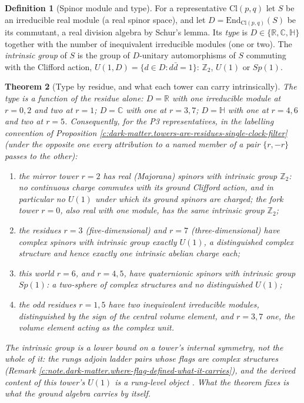 \documentclass[11pt]{article}
\newtheorem{theorem}{Theorem}[section]
\theoremstyle{definition}
\newtheorem{definition}[theorem]{Definition}
\theoremstyle{plain}
\newcommand{\changedmark}[2]{\marginpar{\raggedright\scriptsize\color{#1}#2}}
\providecommand{\C}{}\renewcommand{\C}{\mathbb{C}}
\providecommand{\Cl}{}\renewcommand{\Cl}{\mathrm{Cl}}
\providecommand{\End}{}\renewcommand{\End}{\mathrm{End}}
\providecommand{\R}{}\renewcommand{\R}{\mathbb{R}}
\begin{document}
\begin{definition}[Spinor module and type]\label{c:obj.dark-matter.spinor-module-type}
For a representative $\Cl(p,q)$ let $S$ be an irreducible real module (a real spinor space), and let $D = \End_{\Cl(p,q)}(S)$ be its commutant, a real division algebra by Schur's lemma. Its \emph{type} is $D \in \{\R, \C, \mathbb{H}\}$ together with the number of inequivalent irreducible modules (one or two). The \emph{intrinsic group} of $S$ is the group of $D$-unitary automorphisms of $S$ commuting with the Clifford action, $U(1, D) = \{d \in D : d\bar{d} = 1\}$: $\mathbb{Z}_{2}$, $U(1)$ or $Sp(1)$.
\end{definition}

\begin{theorem}[Type by residue, and what each tower can carry intrinsically]\label{c:dark-matter.type-residue-what-each-tower-can}
\changedmark{gray}{reworded}
The type is a function of the residue alone: $D = \R$ with one irreducible module at $r = 0, 2$ and two at $r = 1$; $D = \C$ with one at $r = 3, 7$; $D = \mathbb{H}$ with one at $r = 4, 6$ and two at $r = 5$. Consequently, for the P3 representatives, in the labelling convention of Proposition \ref{c:dark-matter.towers-are-residues-single-clock-filter} (under the opposite one every attribution to a named member of a pair $\{r, -r\}$ passes to the other):
\begin{enumerate}
\item[(i)] the mirror tower $r = 2$ has real (Majorana) spinors with intrinsic group $\mathbb{Z}_{2}$: no continuous charge commutes with its ground Clifford action, and in particular no $U(1)$ under which its ground spinors are charged; the fork tower $r = 0$, also real with one module, has the same intrinsic group $\mathbb{Z}_{2}$;
\item[(ii)] the residues $r = 3$ (five-dimensional) and $r = 7$ (three-dimensional) have complex spinors with intrinsic group exactly $U(1)$, a distinguished complex structure and hence exactly one intrinsic abelian charge each;
\item[(iii)] this world $r = 6$, and $r = 4, 5$, have quaternionic spinors with intrinsic group $Sp(1)$: a two-sphere of complex structures and no distinguished $U(1)$;
\item[(iv)] the odd residues $r = 1, 5$ have two inequivalent irreducible modules, distinguished by the sign of the central volume element, and $r = 3, 7$ one, the volume element acting as the complex unit.
\end{enumerate}
The intrinsic group is a lower bound on a tower's internal symmetry, not the whole of it: the rungs adjoin ladder pairs whose flags are complex structures (Remark \ref{c:note.dark-matter.where-flag-defined-what-it-carries}), and the derived content of this tower's $U(1)$ is a rung-level object \cite{ButlerT12}. What the theorem fixes is what the ground algebra carries by itself.
\end{theorem}
\end{document}
